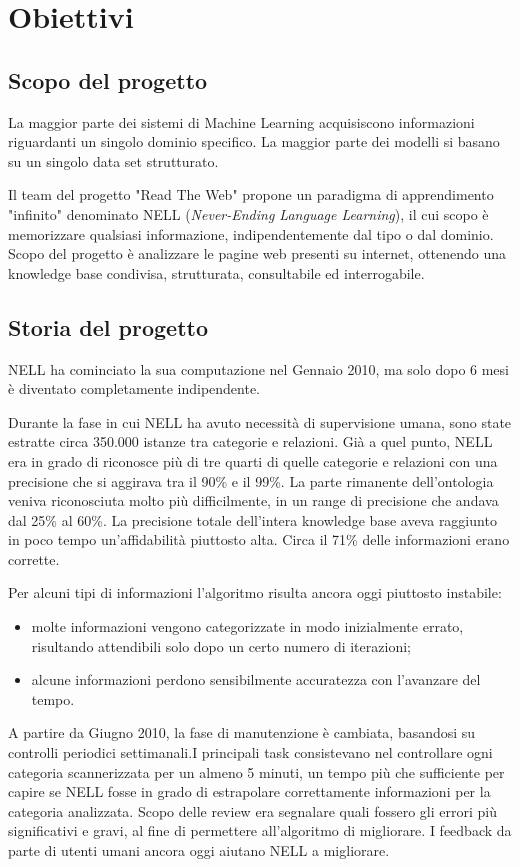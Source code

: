 \section{Obiettivi}

\subsection{Scopo del progetto}
La maggior parte dei sistemi di Machine Learning acquisiscono informazioni riguardanti un singolo dominio specifico. La maggior parte dei modelli si basano su un singolo data set strutturato.

\noindent Il team del progetto "Read The Web" propone un paradigma di apprendimento "infinito" denominato NELL (\textit{Never-Ending Language Learning}), il  cui scopo è memorizzare qualsiasi informazione, indipendentemente dal tipo o dal dominio. Scopo del progetto è analizzare le pagine web presenti su internet, ottenendo una knowledge base condivisa, strutturata, consultabile ed interrogabile.
\subsection{Storia del progetto}
NELL ha cominciato la sua computazione nel Gennaio 2010, ma solo dopo 6 mesi è diventato completamente indipendente.

\noindent Durante la fase in cui NELL ha avuto necessità di supervisione umana, sono state estratte circa 350.000 istanze tra categorie e relazioni. Già a quel punto, NELL era in grado di riconosce più di tre quarti di quelle categorie e relazioni con una precisione che si aggirava tra il 90\% e il 99\%. La parte rimanente dell'ontologia veniva riconosciuta molto più difficilmente, in un range di precisione che andava dal 25\% al 60\%. La precisione totale dell'intera knowledge base aveva raggiunto in poco tempo un'affidabilità piuttosto alta. Circa il 71\% delle informazioni erano corrette.

\noindent Per alcuni tipi di informazioni l'algoritmo risulta ancora oggi piuttosto instabile:
\begin{itemize}
    \item molte informazioni vengono categorizzate in modo inizialmente errato, risultando attendibili solo dopo un certo numero di iterazioni;
    \item alcune informazioni perdono sensibilmente accuratezza con l'avanzare del tempo.
\end{itemize}

\noindent A partire da Giugno 2010, la fase di manutenzione è cambiata, basandosi su controlli periodici settimanali.I principali task consistevano nel controllare ogni categoria scannerizzata per un almeno 5 minuti, un tempo più che sufficiente per capire se NELL fosse in grado di estrapolare correttamente informazioni per la categoria analizzata. Scopo delle review era segnalare quali fossero gli errori più significativi e gravi, al fine di permettere all'algoritmo di migliorare. I feedback da parte di utenti umani ancora oggi aiutano NELL a migliorare.

